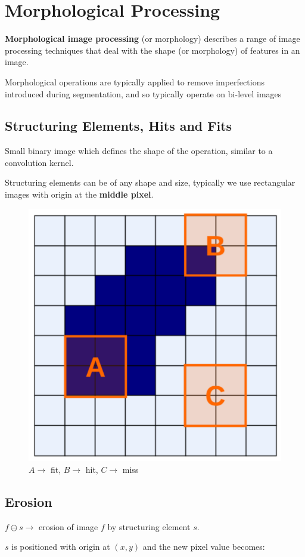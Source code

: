 \section*{Morphological Processing}

\textbf{Morphological image processing} (or morphology) describes a
range of image processing techniques that deal with the shape (or
morphology) of features in an image.

Morphological operations are typically applied to remove
imperfections introduced during segmentation, and so typically
operate on bi-level images

\subsection*{Structuring Elements, Hits and Fits}

Small binary image which defines the shape of the operation, similar
to a convolution kernel.

Structuring elements can be of any shape and size, typically we use
rectangular images with origin at the \textbf{middle pixel}.

\begin{figure}[H]
  \centering
  \includegraphics[width=0.5\linewidth]{images/hits_and_fits.png}
  \caption{$A \rightarrow$ fit, $B \rightarrow$ hit, $C \rightarrow$ miss}
\end{figure}

\subsection*{Erosion}

$f \ominus s \rightarrow$ erosion of image $f$ by structuring element $s$.

$s$ is positioned with origin at $(x, y)$ and the new pixel value becomes:


